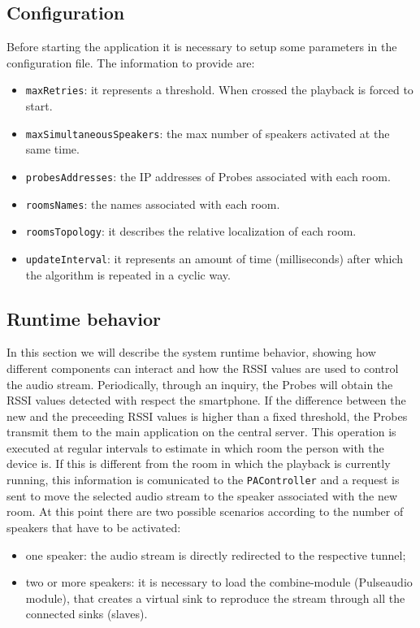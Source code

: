 \documentclass[conference]{IEEEtran}
\begin{document}
\subsection{Configuration}
Before starting the application it is necessary to setup some parameters in the configuration file. The information to provide are:
\begin{itemize}
\item \texttt{maxRetries}: it represents a threshold. When crossed the playback is forced to start.
\item \texttt{maxSimultaneousSpeakers}: the max number of speakers activated at the same time.
\item \texttt{probesAddresses}: the IP addresses of Probes associated with each room.
\item \texttt{roomsNames}: the names associated with each room.
\item \texttt{roomsTopology}: it describes the relative localization of each room. %
\item \texttt{updateInterval}: it represents an amount of time (milliseconds) after which the algorithm is repeated in a cyclic way. 
\end{itemize}

\subsection{Runtime behavior}
In this section we will describe the system runtime behavior, showing how different components can interact and how the RSSI values are used to control the audio stream.
Periodically, through an inquiry, the Probes will obtain the RSSI values detected with respect the smartphone. If the difference between the new and the preceeding RSSI values is higher than a fixed threshold, the Probes transmit them to the main application on the central server. This operation is executed at regular intervals to estimate in which room the person with the device is. If this is different from the room in which the playback is currently running, this information is comunicated to the \texttt{PAController} and a request is sent to move the selected audio stream to the speaker associated with the new room. At this point there are two possible scenarios according to the number of speakers that have to be activated:
\begin{itemize}
\item one speaker: the audio stream is directly redirected to the respective tunnel;
\item two or more speakers: it is necessary to load the combine-module (Pulseaudio module), that creates a virtual sink to reproduce the stream through all the connected sinks (slaves).
\end{itemize}
\end{document}
